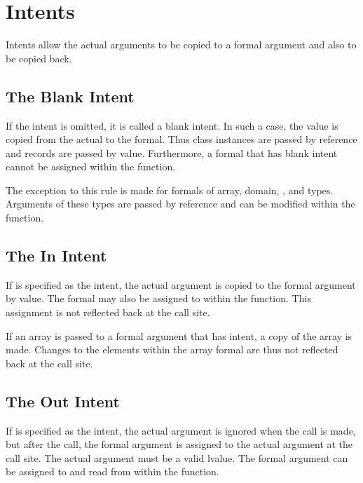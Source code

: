 \section{Intents}
\label{Intents}

Intents allow the actual arguments to be copied to a formal argument
and also to be copied back.

\subsection{The Blank Intent}
\label{The_Blank_Intent}

If the intent is omitted, it is called a blank intent.  In such a
case, the value is copied from the actual to the formal.  Thus
class instances are passed by reference and records are passed by value.
Furthermore, a formal that has blank intent
cannot be assigned within the function.

The exception to this rule is made for formals of array, domain, ,
and  types. Arguments of these types are passed by reference
and can be modified within the function.

\subsection{The In Intent}
\label{The_In_Intent}

If  is specified as the intent, the actual argument is copied
to the formal argument by value.
The formal may also be assigned to within
the function.  This assignment is not reflected back at the call site.

If an array is passed to a formal argument that has  intent,
a copy of the array is made.  Changes to the elements
within the array formal are thus not reflected back at the call site.

\subsection{The Out Intent}
\label{The_Out_Intent}

If  is specified as the intent, the actual argument is
ignored when the call is made, but after the call, the formal argument
is assigned to the actual argument at the call site.  The actual
argument must be a valid lvalue.  The formal argument can be assigned
to and read from within the function.

